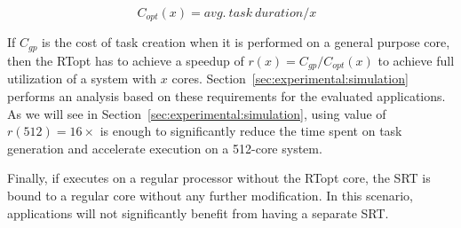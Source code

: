 \begin{equation}
  \text{$C_{opt}(x) = avg.\ task\ duration / x$ }
\label{eq.create}
\end{equation}

If $C_{gp}$ is the cost of task creation when it is performed on a general purpose core, then the RTopt has to achieve a speedup of $r(x) = C_{gp}/C_{opt}(x)$ to achieve full utilization of a system with $x$ cores. 
Section~\ref{sec:experimental:simulation} performs an analysis based on these requirements for the evaluated applications. 
As we will see in Section~\ref{sec:experimental:simulation}, using value of $r(512)=16\times$ is enough to significantly reduce  the time spent on task generation and accelerate execution on a 512-core system.

Finally, if {\proposal} executes on a regular processor without the RTopt core, the SRT is bound to a regular core without any further modification. In this scenario, applications will not significantly benefit from having a separate SRT.



